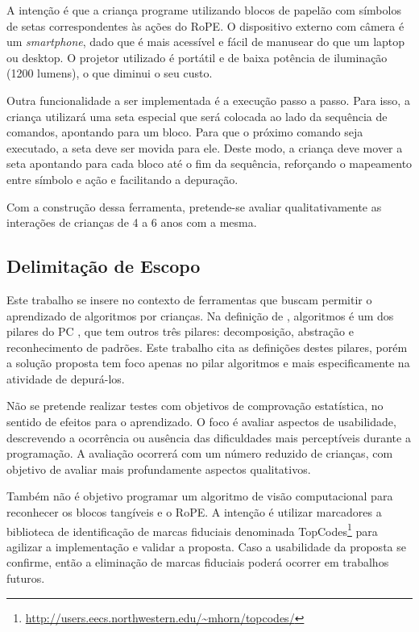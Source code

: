 A intenção é que a criança programe utilizando blocos de papelão com símbolos de setas correspondentes às ações do RoPE. O dispositivo externo com câmera é um \textit{smartphone}, dado que é mais acessível e fácil de manusear do que um laptop ou desktop. O projetor utilizado é portátil e de baixa potência de iluminação (1200 lumens), o que diminui o seu custo.

Outra funcionalidade a ser implementada é a execução passo a passo. Para isso, a criança utilizará uma seta especial que será colocada ao lado da sequência de comandos, apontando para um bloco. Para que o próximo comando seja executado, a seta deve ser movida para ele. Deste modo, a criança deve mover a seta apontando para cada bloco até o fim da sequência, reforçando o mapeamento entre símbolo e ação e facilitando a depuração.

Com a construção dessa ferramenta, pretende-se avaliar qualitativamente as interações de crianças de 4 a 6 anos com a mesma. 

\subsection{Delimitação de Escopo}
\label{ss_cintro_escopo}

Este trabalho se insere no contexto de ferramentas que buscam permitir o aprendizado de algoritmos por crianças. Na definição de , algoritmos é um dos pilares do \acl{PC} \cite{brackmann_desenvolvimento_2017}, que tem outros três pilares: decomposição, abstração e reconhecimento de padrões. Este trabalho cita as definições destes pilares, porém a solução proposta tem foco apenas no pilar algoritmos e mais especificamente na atividade de depurá-los.

Não se pretende realizar testes com objetivos de comprovação estatística, no sentido de efeitos para o aprendizado. O foco é avaliar aspectos de usabilidade, descrevendo a ocorrência ou ausência das dificuldades mais perceptíveis durante a programação. A avaliação ocorrerá com um número reduzido de crianças, com objetivo de avaliar mais profundamente aspectos qualitativos.

Também não é objetivo programar um algoritmo de visão computacional para reconhecer os blocos tangíveis e o RoPE. A intenção é utilizar marcadores a biblioteca de identificação de marcas fiduciais denominada TopCodes\footnote{\url{http://users.eecs.northwestern.edu/~mhorn/topcodes/}} para agilizar a implementação e validar a proposta. Caso a usabilidade da proposta se confirme, então a eliminação de marcas fiduciais poderá ocorrer em trabalhos futuros.

